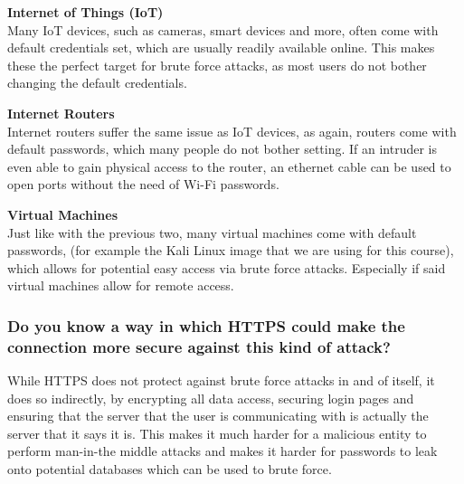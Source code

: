 \textbf{Internet of Things (IoT)}\\
Many IoT devices, such as cameras, smart devices and more, often come with default credentials set, which are usually readily available online. This makes these the perfect target for brute force attacks, as most users do not bother changing the default credentials.

\textbf{Internet Routers}\\
Internet routers suffer the same issue as IoT devices, as again, routers come with default passwords, which many people do not bother setting. If an intruder is even able to gain physical access to the router, an ethernet cable can be used to open ports without the need of Wi-Fi passwords.

\textbf{Virtual Machines}\\
Just like with the previous two, many virtual machines come with default passwords, (for example the Kali Linux image that we are using for this course), which allows for potential easy access via brute force attacks. Especially if said virtual machines allow for remote access.

\subsubsection{Do you know a way in which HTTPS could make the
    connection more secure against this kind of attack?}
While HTTPS does not protect against brute force attacks in and of itself, it does so indirectly, by encrypting all data access, securing login pages and ensuring that the server that the user is communicating with is actually the server that it says it is. This makes it much harder for a malicious entity to perform man-in-the middle attacks and makes it harder for passwords to leak onto potential databases which can be used to brute force.